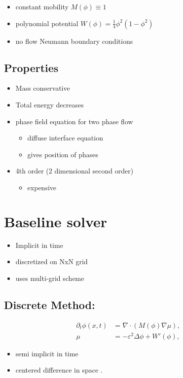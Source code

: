 \documentclass[11pt]{article}
\begin{document}
\begin{itemize}
\item constant mobility \(M(\phi) \equiv 1\)
\item polynomial potential \(W(\phi) = \frac{1}{4} \phi^2(1-\phi^2)\)
\item no flow Neumann boundary conditions
\end{itemize}
\subsection*{Properties}
\label{sec:org5836bbb}
\begin{itemize}
\item Mass conservative
\item Total energy decreases
\item phase field equation for two phase flow
\begin{itemize}
\item diffuse interface equation
\item gives position of phases
\end{itemize}
\item 4th order (2 dimensional second order)
\begin{itemize}
\item expensive
\end{itemize}
\end{itemize}
\section*{Baseline solver}
\label{sec:org1ce16b2}
\begin{itemize}
\item Implicit in time
\item discretized on NxN grid
\item uses multi-grid scheme
\end{itemize}
\subsection*{Discrete Method:}
\label{sec:org3019139}
\begin{equation}
\begin{aligned}
\partial_{t}\phi(x,t) &=  \nabla \cdot(M(\phi)\nabla\mu), \\
\mu &= - \varepsilon^2 \Delta\phi  + W'(\phi),
\end{aligned}
\end{equation}
\begin{itemize}
\item semi implicit in time
\item centered difference in space \autocite{SHIN20117441} .
\end{itemize}
\end{document}
